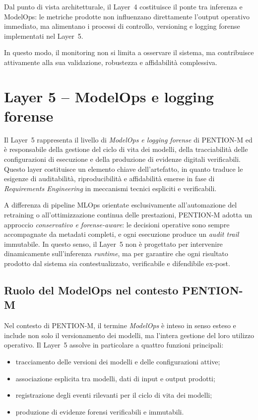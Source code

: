 Dal punto di vista architetturale, il Layer~4 costituisce il ponte tra inferenza e ModelOps: le metriche prodotte non influenzano direttamente l’output operativo immediato, ma alimentano i processi di controllo, versioning e logging forense implementati nel Layer~5.

In questo modo, il monitoring non si limita a osservare il sistema, ma contribuisce attivamente alla sua validazione, robustezza e affidabilità complessiva.

\section{Layer 5 -- ModelOps e logging forense}
\label{sec:layer5_modelops_forensic}

Il Layer~5 rappresenta il livello di \emph{ModelOps e logging forense} di \textsc{PENTION-M} ed è responsabile della gestione del ciclo di vita dei modelli, della tracciabilità delle configurazioni di esecuzione e della produzione di evidenze digitali verificabili.
Questo layer costituisce un elemento chiave dell’artefatto, in quanto traduce le esigenze di auditabilità, riproducibilità e affidabilità emerse in fase di \emph{Requirements Engineering} in meccanismi tecnici espliciti e verificabili.

A differenza di pipeline MLOps orientate esclusivamente all’automazione del retraining o all’ottimizzazione continua delle prestazioni, \textsc{PENTION-M} adotta un approccio \emph{conservativo e forense-aware}: le decisioni operative sono sempre accompagnate da metadati completi, e ogni esecuzione produce un \textit{audit trail} immutabile.
In questo senso, il Layer~5 non è progettato per intervenire dinamicamente sull’inferenza \textit{runtime}, ma per garantire che ogni risultato prodotto dal sistema sia contestualizzato, verificabile e difendibile ex-post.

\subsection{Ruolo del ModelOps nel contesto PENTION-M}

Nel contesto di \textsc{PENTION-M}, il termine \emph{ModelOps} è inteso in senso esteso e include non solo il versionamento dei modelli, ma l’intera gestione del loro utilizzo operativo.
Il Layer~5 assolve in particolare a quattro funzioni principali:
\begin{itemize}
	\item tracciamento delle versioni dei modelli e delle configurazioni attive;
	\item associazione esplicita tra modelli, dati di input e output prodotti;
	\item registrazione degli eventi rilevanti per il ciclo di vita dei modelli;
	\item produzione di evidenze forensi verificabili e immutabili.
\end{itemize}

